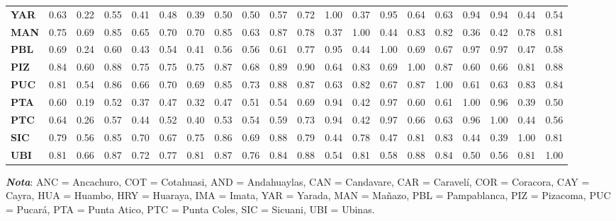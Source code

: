 \begin{landscape}
\begin{table}[htbp]
{\begin{tabular}{lccccccccccccccccccc}
\textbf{YAR}  & 0.63  & 0.22  & 0.55  & 0.41  & 0.48  & 0.39  & 0.50  & 0.50  & 0.57  & 0.72  & 1.00  & 0.37  & 0.95  & 0.64  & 0.63  & 0.94  & 0.94  & 0.44  & 0.54  \\
\textbf{MAN}  & 0.75  & 0.69  & 0.85  & 0.65  & 0.70  & 0.70  & 0.85  & 0.63  & 0.87  & 0.78  & 0.37  & 1.00  & 0.44  & 0.83  & 0.82  & 0.36  & 0.42  & 0.78  & 0.81  \\
\textbf{PBL}  & 0.69  & 0.24  & 0.60  & 0.43  & 0.54  & 0.41  & 0.56  & 0.56  & 0.61  & 0.77  & 0.95  & 0.44  & 1.00  & 0.69  & 0.67  & 0.97  & 0.97  & 0.47  & 0.58  \\
\textbf{PIZ}  & 0.84  & 0.60  & 0.88  & 0.75  & 0.75  & 0.75  & 0.87  & 0.68  & 0.89  & 0.90  & 0.64  & 0.83  & 0.69  & 1.00  & 0.87  & 0.60  & 0.66  & 0.81  & 0.88  \\
\textbf{PUC}  & 0.81  & 0.54  & 0.86  & 0.66  & 0.70  & 0.69  & 0.85  & 0.73  & 0.88  & 0.87  & 0.63  & 0.82  & 0.67  & 0.87  & 1.00  & 0.61  & 0.63  & 0.83  & 0.84  \\
\textbf{PTA}  & 0.60  & 0.19  & 0.52  & 0.37  & 0.47  & 0.32  & 0.47  & 0.51  & 0.54  & 0.69  & 0.94  & 0.42  & 0.97  & 0.60  & 0.61  & 1.00  & 0.96  & 0.39  & 0.50  \\
\textbf{PTC}  & 0.64  & 0.26  & 0.57  & 0.44  & 0.52  & 0.40  & 0.53  & 0.54  & 0.59  & 0.73  & 0.94  & 0.42  & 0.97  & 0.66  & 0.63  & 0.96  & 1.00  & 0.44  & 0.56  \\
\textbf{SIC}  & 0.79  & 0.56  & 0.85  & 0.70  & 0.67  & 0.75  & 0.86  & 0.69  & 0.88  & 0.79  & 0.44  & 0.78  & 0.47  & 0.81  & 0.83  & 0.44  & 0.39  & 1.00  & 0.81  \\
\textbf{UBI}  & 0.81  & 0.66  & 0.87  & 0.72  & 0.77  & 0.81  & 0.87  & 0.76  & 0.84  & 0.88  & 0.54  & 0.81  & 0.58  & 0.88  & 0.84  & 0.50  & 0.56  & 0.81  & 1.00  \\
\hline
\end{tabular}
}
\vspace{0.5em}
\begin{flushleft}
\footnotesize
\textbf{\textit{Nota}}: ANC = Ancachuro, COT = Cotahuasi, AND = Andahuaylas, CAN = Candavare, CAR = Caravelí, COR = Coracora, CAY = Cayra, HUA = Huambo, HRY = Huaraya, IMA = Imata, YAR = Yarada, MAN = Mañazo, PBL = Pampablanca, PIZ = Pizacoma, PUC = Pucará, PTA = Punta Atico, PTC = Punta Coles, SIC = Sicuani, UBI = Ubinas.
\end{flushleft}
\end{table}
\end{landscape}


